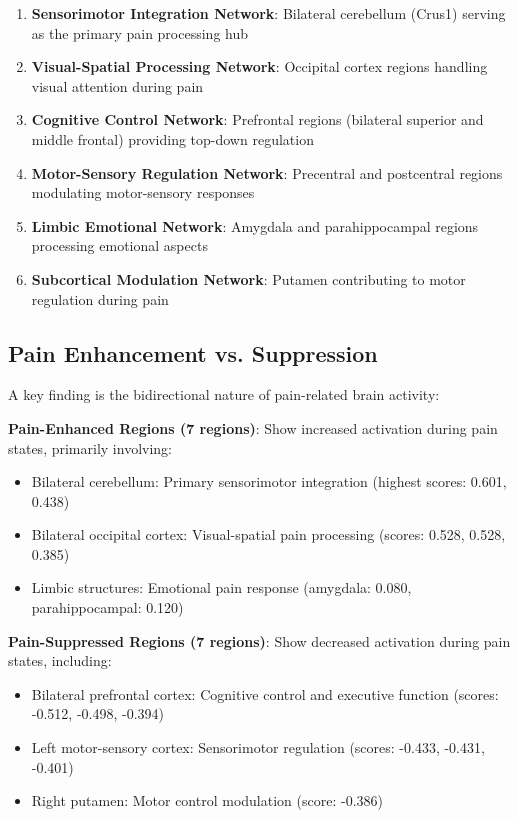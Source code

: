 \documentclass[10pt,journal,compsoc]{IEEEtran}
\begin{document}
\begin{enumerate}
\item \textbf{Sensorimotor Integration Network}: Bilateral cerebellum (Crus1) serving as the primary pain processing hub
\item \textbf{Visual-Spatial Processing Network}: Occipital cortex regions handling visual attention during pain
\item \textbf{Cognitive Control Network}: Prefrontal regions (bilateral superior and middle frontal) providing top-down regulation
\item \textbf{Motor-Sensory Regulation Network}: Precentral and postcentral regions modulating motor-sensory responses
\item \textbf{Limbic Emotional Network}: Amygdala and parahippocampal regions processing emotional aspects
\item \textbf{Subcortical Modulation Network}: Putamen contributing to motor regulation during pain
\end{enumerate}

\subsection{Pain Enhancement vs. Suppression}

A key finding is the bidirectional nature of pain-related brain activity:

\textbf{Pain-Enhanced Regions (7 regions)}: Show increased activation during pain states, primarily involving:
\begin{itemize}
\item Bilateral cerebellum: Primary sensorimotor integration (highest scores: 0.601, 0.438)
\item Bilateral occipital cortex: Visual-spatial pain processing (scores: 0.528, 0.528, 0.385)
\item Limbic structures: Emotional pain response (amygdala: 0.080, parahippocampal: 0.120)
\end{itemize}

\textbf{Pain-Suppressed Regions (7 regions)}: Show decreased activation during pain states, including:
\begin{itemize}
\item Bilateral prefrontal cortex: Cognitive control and executive function (scores: -0.512, -0.498, -0.394)
\item Left motor-sensory cortex: Sensorimotor regulation (scores: -0.433, -0.431, -0.401)
\item Right putamen: Motor control modulation (score: -0.386)
\end{itemize}
\end{document}
